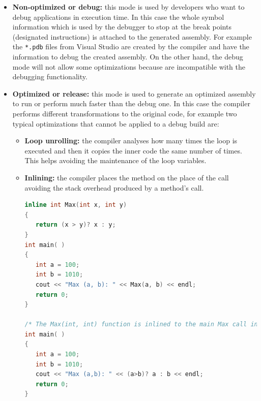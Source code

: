 \begin{itemize}
  \item \textbf{Non-optimized or debug:} this mode is used by developers who want to debug applications in execution time. In this case the whole symbol information which is used by the debugger to stop at the break points (designated instructions) is attached to the generated assembly. For example the \verb!*.pdb! files from Visual Studio are created by the compiler and have the information to debug the created assembly. On the other hand, the debug mode will not allow some optimizations because are incompatible with the debugging functionality.
  \item \textbf{Optimized or release:} this mode is used to generate an optimized assembly to run or perform much faster than the debug one. In this case the compiler performs different transformations to the original code, for example two typical optimizations that cannot be applied to a debug build are:
  \begin{itemize}
  	\item \textbf{Loop unrolling:} the compiler analyses how many times the loop is executed and then it copies the inner code the same number of times. This helps avoiding the maintenance of the loop variables.
  	\item \textbf{Inlining:} the compiler places the method on the place of the call avoiding the stack overhead produced by a method's call.
  	\begin{lstlisting}[language=C++, caption={Inline example}]
inline int Max(int x, int y)
{
   return (x > y)? x : y;
}
int main( )
{
   int a = 100;
   int b = 1010;
   cout << "Max (a, b): " << Max(a, b) << endl;
   return 0;
}

/* The Max(int, int) function is inlined to the main Max call in the following way:*/
int main( )
{
   int a = 100;
   int b = 1010;
   cout << "Max (a,b): " << (a>b)? a : b << endl;
   return 0;
}
\end{lstlisting}
  \end{itemize}
\end{itemize}

